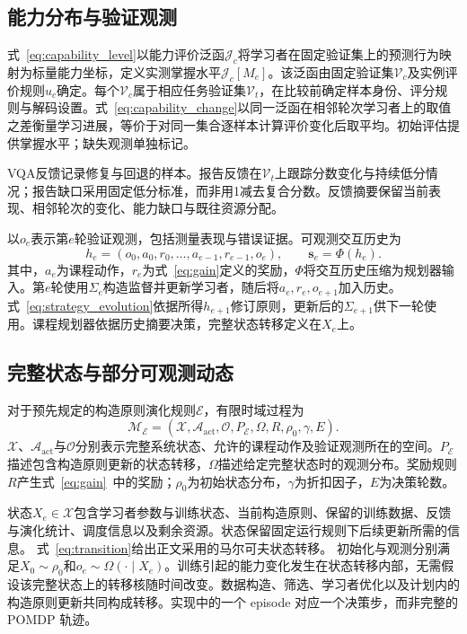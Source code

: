 \subsection{能力分布与验证观测}

式~\ref{eq:capability_level}以能力评价泛函$\mathcal J_c$将学习者在固定验证集上的预测行为映射为标量能力坐标，定义实测掌握水平$\mathcal J_c[M_e]$。该泛函由固定验证集$\mathcal V_c$及实例评价规则$u_c$确定。每个$\mathcal V_c$属于相应任务验证集$\mathcal V_t$，在比较前确定样本身份、评分规则与解码设置。式~\ref{eq:capability_change}以同一泛函在相邻轮次学习者上的取值之差衡量学习进展，等价于对同一集合逐样本计算评价变化后取平均。初始评估提供掌握水平；缺失观测单独标记。

VQA反馈记录修复与回退的样本。报告反馈在$\mathcal V_t$上跟踪分数变化与持续低分情况；报告缺口采用固定低分标准，而非用1减去复合分数。反馈摘要保留当前表现、相邻轮次的变化、能力缺口与既往资源分配。

以$o_e$表示第$e$轮验证观测，包括测量表现与错误证据。可观测交互历史为
\[
h_e=(o_0,a_0,r_0,\ldots,a_{e-1},r_{e-1},o_e),
\qquad \mathbf{s}_e=\Phi(h_e).
\]
其中，$a_e$为课程动作，$r_e$为式~\ref{eq:gain}定义的奖励，$\Phi$将交互历史压缩为规划器输入。第$e$轮使用$\Sigma_e$构造监督并更新学习者，随后将$a_e,r_e,o_{e+1}$加入历史。式~\ref{eq:strategy_evolution}依据所得$h_{e+1}$修订原则，更新后的$\Sigma_{e+1}$供下一轮使用。课程规划器依据历史摘要决策，完整状态转移定义在$X_e$上。

\subsection{完整状态与部分可观测动态}

对于预先规定的构造原则演化规则$\mathscr E$，有限时域过程为
\[
\mathcal M_{\mathscr E}=(\mathcal X,\mathcal A_{\mathrm{act}},\mathcal O,P_{\mathscr E},\Omega,R,\rho_0,\gamma,E).
\]
$\mathcal X$、$\mathcal A_{\mathrm{act}}$与$\mathcal O$分别表示完整系统状态、允许的课程动作及验证观测所在的空间。$P_{\mathscr E}$描述包含构造原则更新的状态转移，$\Omega$描述给定完整状态时的观测分布。奖励规则$R$产生式~\ref{eq:gain}~中的奖励；$\rho_0$为初始状态分布，$\gamma$为折扣因子，$E$为决策轮数。

状态$X_e\in\mathcal X$包含学习者参数与训练状态、当前构造原则、保留的训练数据、反馈与演化统计、调度信息以及剩余资源。状态保留固定运行规则下后续更新所需的信息。
式~\ref{eq:transition}给出正文采用的马尔可夫状态转移。
初始化与观测分别满足$X_0\sim\rho_0$和$o_e\sim\Omega(\cdot\mid X_e)$。训练引起的能力变化发生在状态转移内部，无需假设该完整状态上的转移核随时间改变。数据构造、筛选、学习者优化以及计划内的构造原则更新共同构成转移。实现中的一个 episode 对应一个决策步，而非完整的 POMDP 轨迹。

